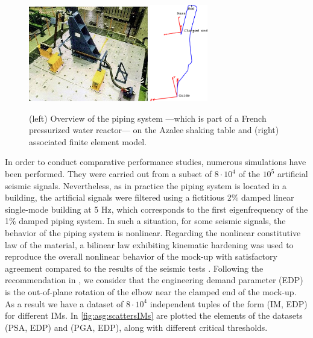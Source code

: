 \begin{figure}[h]
		\centering		
		\includegraphics[width=5.2cm]{figures/intro-frags/ASG.jpg}
		\hspace{1cm}
		\includegraphics[width=2.5cm]{figures/intro-frags/ASG_FEM.pdf}
		\caption{(left) Overview of the piping system ---which is part of a French pressurized water reactor--- on the Azalee shaking table and (right) associated finite element model.}
		\label{fig:ASG}
	\end{figure}




    {In order to conduct comparative performance studies, numerous simulations have been performed. They were carried out from a subset of $8\cdot10^4$ of the $10^5$ artificial seismic signals. Nevertheless, as in practice the piping system is located in a building, the artificial signals were filtered using a fictitious 2\% damped linear single-mode building at 5 Hz, which corresponds to the first eigenfrequency of the 1\% damped piping system.  In such a situation, for some seismic signals, the behavior of the piping system is nonlinear. Regarding the nonlinear constitutive law of the material, a bilinear law exhibiting kinematic hardening was used to reproduce the overall nonlinear behavior of the mock-up with satisfactory agreement compared to the results of the seismic tests \citep{touboul_seismic_1999}. Following the recommendation in \cite{touboul_enhanced_2006}, we consider that the engineering demand parameter (EDP) is the out-of-plane rotation of the elbow near the clamped end of the mock-up. As a result we have a dataset of $8\cdot10^4$ independent tuples of the form (IM, EDP) for different IMs. In \cref{fig:asg:scattersIMs} are plotted the elements of the datasets (PSA, EDP) and (PGA, EDP), along with different critical thresholds.}


